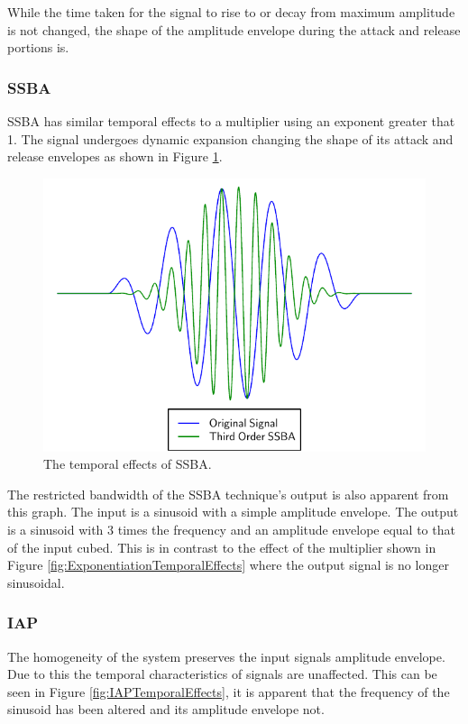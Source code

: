 			While the time taken for the signal to rise to or decay from maximum amplitude is not changed, the
			shape of the amplitude envelope during the attack and release portions is. 

		\subsubsection*{SSBA}
			SSBA has similar temporal effects to a multiplier using an exponent greater that 1. The signal
			undergoes dynamic expansion changing the shape of its attack and release envelopes as shown in
			Figure \ref{fig:SSBATemporalEffects}.

			\begin{figure}[h!]
				\centering
				\includegraphics{chapter5/Images/SSBATemporalEffects.pdf}
				\caption{The temporal effects of SSBA.}
				\label{fig:SSBATemporalEffects}
			\end{figure}

			The restricted bandwidth of the SSBA technique's output is also apparent from this graph. The input
			is a sinusoid with a simple amplitude envelope. The output is a sinusoid with 3 times the frequency
			and an amplitude envelope equal to that of the input cubed. This is in contrast to the effect of
			the multiplier shown in Figure \ref{fig:ExponentiationTemporalEffects} where the output signal is
			no longer sinusoidal.

		\subsubsection*{IAP}
			The homogeneity of the system preserves the input signals amplitude envelope. Due to this the
			temporal characteristics of signals are unaffected. This can be seen in Figure
			\ref{fig:IAPTemporalEffects}, it is apparent that the frequency of the sinusoid has been altered
			and its amplitude envelope not.


